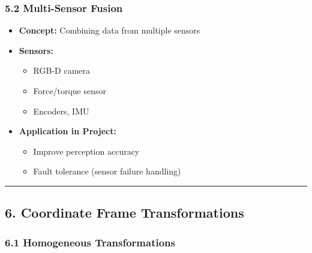 \documentclass[
]{article}
\providecommand{\tightlist}{%
  \setlength{\itemsep}{0pt}\setlength{\parskip}{0pt}}
\begin{document}
\hypertarget{multi-sensor-fusion}{%
\subsubsection{5.2 Multi-Sensor Fusion}\label{multi-sensor-fusion}}

\begin{itemize}
\tightlist
\item
  \textbf{Concept:} Combining data from multiple sensors
\item
  \textbf{Sensors:}

  \begin{itemize}
  \tightlist
  \item
    RGB-D camera
  \item
    Force/torque sensor
  \item
    Encoders, IMU
  \end{itemize}
\item
  \textbf{Application in Project:}

  \begin{itemize}
  \tightlist
  \item
    Improve perception accuracy
  \item
    Fault tolerance (sensor failure handling)
  \end{itemize}
\end{itemize}

\begin{center}\rule{0.5\linewidth}{0.5pt}\end{center}

\hypertarget{coordinate-frame-transformations}{%
\subsection{6. Coordinate Frame
Transformations}\label{coordinate-frame-transformations}}

\hypertarget{homogeneous-transformations}{%
\subsubsection{6.1 Homogeneous
Transformations}\label{homogeneous-transformations}}
\end{document}

